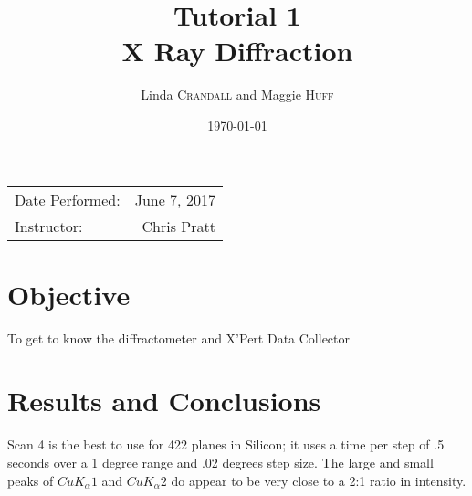 \documentclass{article}
\title{Tutorial 1\\ X Ray Diffraction \\ } %
\author{Linda \textsc{Crandall} and Maggie \textsc{Huff}} %
\date{\today} %
\begin{document}
\maketitle %

\begin{center}
\begin{tabular}{l r}
Date Performed: & June 7, 2017 \\ %
Instructor: & Chris Pratt %
\end{tabular}
\end{center}



\section{Objective}

To get to know the diffractometer and X'Pert Data Collector 




\section{Results and Conclusions}

Scan 4 is the best to use for {422} planes in Silicon; it uses a time per step of .5 seconds over a 1 degree range and .02 degrees step size. The large and small peaks of $CuK_\alpha1$ and $CuK_\alpha2$ do appear to be very close to a 2:1 ratio in intensity. 
\end{document}
